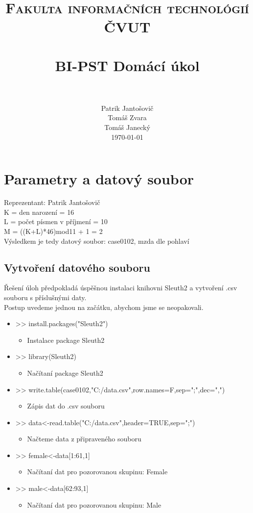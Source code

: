\documentclass[paper=a4, fontsize=12pt]{scrartcl}
\title{
		\usefont{OT1}{bch}{b}{n}
		\normalfont \normalsize \textsc{Fakulta informačních technológií ČVUT} \\ [25pt]
		\horrule{0.5pt} \\[0.4cm]
		\huge BI-PST Domácí úkol \\
		\horrule{2pt} \\[0.5cm]
}
\author{
		\normalfont 								\normalsize
        Patrik Jantošovič\\[-3pt]		\normalsize
        Tomáš Zvara\\[-3pt]		\normalsize
        Tomáš Janecký\\[-3pt]		\normalsize
        \today
}
\date{}
\numberwithin{equation}{section}		%
\numberwithin{figure}{section}			%
\numberwithin{table}{section}				%
\begin{document}
\maketitle
\section{Parametry a datový soubor}
Reprezentant: Patrik Jantošovič\\
K = den narození = 16\\
L = počet písmen v příjmení = 10\\
M = ((K+L)*46)mod11 + 1 = 2\\
Výsledkem je tedy datový soubor: case0102, mzda dle pohlaví\\

\subsection{Vytvoření datového souboru}
Řešení úloh předpokladá úspěšnou instalaci knihovni Sleuth2 a vytvoření .csv souboru s příslušnými daty.\\
Postup uvedeme jednou na začátku, abychom jsme se neopakovali.

\begin{itemize}
	\item >> install.packages("Sleuth2")
		\begin{itemize}
		\item Instalace package Sleuth2 
		\end{itemize}
	\item >> library(Sleuth2)
		\begin{itemize}
		\item Načítaní package Sleuth2 
		\end{itemize}
	\item >> write.table(case0102,"C:/data.csv",row.names=F,sep=";",dec=",")
		\begin{itemize}
		\item Zápis dat do .csv souboru
		\end{itemize}
	\item >> data<-read.table("C:/data.csv",header=TRUE,sep=";") 
		\begin{itemize}
		\item Načteme data z připraveného souboru
		\end{itemize}
	\item >> female<-data[1:61,1]
		\begin{itemize}
		\item Načítaní dat pro pozorovanou skupinu: Female
		\end{itemize}
	\item >> male<-data[62:93,1]
		\begin{itemize}
		\item Načítaní dat pro pozorovanou skupinu: Male
		\end{itemize}
\end{itemize}
\end{document}
